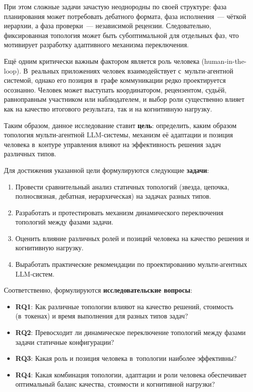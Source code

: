 \documentclass[12pt, a4paper]{article}
\begin{document}
При этом сложные задачи зачастую неоднородны по своей структуре: фаза планирования может потребовать дебатного формата, фаза исполнения~--- чёткой иерархии, а фаза проверки~--- независимой рецензии. Следовательно, фиксированная топология может быть субоптимальной для отдельных фаз, что мотивирует разработку адаптивного механизма переключения.

Ещё одним критически важным фактором является роль человека (human-in-the-loop). В~реальных приложениях человек взаимодействует с~мульти-агентной системой, однако его позиция в~графе коммуникации редко проектируется осознанно. Человек может выступать координатором, рецензентом, судьёй, равноправным участником или наблюдателем, и выбор роли существенно влияет как на качество итогового результата, так и на когнитивную нагрузку.

Таким образом, данное исследование ставит \textbf{цель}: определить, каким образом топология мульти-агентной LLM-системы, механизм её адаптации и позиция человека в~контуре управления влияют на эффективность решения задач различных типов.

Для достижения указанной цели формулируются следующие \textbf{задачи}:
\begin{enumerate}[noitemsep]
    \item Провести сравнительный анализ статичных топологий (звезда, цепочка, полносвязная, дебатная, иерархическая) на задачах разных типов.
    \item Разработать и протестировать механизм динамического переключения топологий между фазами задачи.
    \item Оценить влияние различных ролей и позиций человека на качество решения и когнитивную нагрузку.
    \item Выработать практические рекомендации по проектированию мульти-агентных LLM-систем.
\end{enumerate}

Соответственно, формулируются \textbf{исследовательские вопросы}:
\begin{itemize}[noitemsep]
    \item \textbf{RQ1}: Как различные топологии влияют на качество решений, стоимость (в~токенах) и время выполнения для разных типов задач?
    \item \textbf{RQ2}: Превосходит ли динамическое переключение топологий между фазами задачи статичные конфигурации?
    \item \textbf{RQ3}: Какая роль и позиция человека в~топологии наиболее эффективны?
    \item \textbf{RQ4}: Какая комбинация топологии, адаптации и роли человека обеспечивает оптимальный баланс качества, стоимости и когнитивной нагрузки?
\end{itemize}
\end{document}
